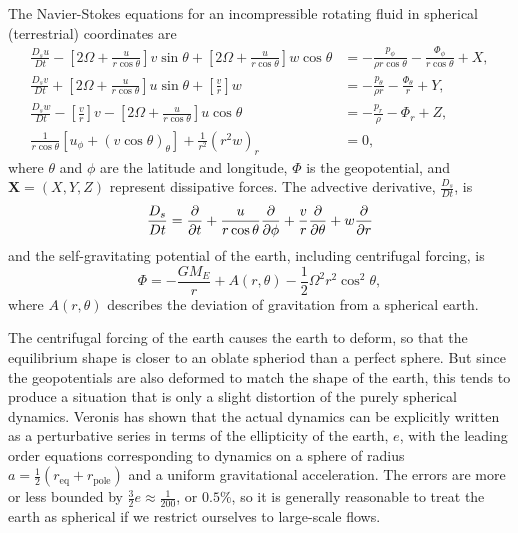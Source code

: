 \documentclass[11pt]{article}
\begin{document}
The Navier-Stokes equations for an incompressible rotating fluid in spherical (terrestrial) coordinates are
\begin{subequations}
\begin{align}
\frac{D_s u}{Dt} - \left[2\Omega + \frac{u}{r \cos \theta} \right] v \sin \theta + \left[2\Omega + \frac{u}{r \cos \theta} \right] w \cos \theta &= - \frac{p_\phi}{\rho r \cos \theta} - \frac{\Phi_\phi}{r \cos \theta} + X, \\
\frac{D_s v}{Dt} + \left[2\Omega + \frac{u}{r \cos \theta}\right] u \sin \theta + \left[\frac{v}{r}\right] w &= - \frac{p_\theta}{\rho r} - \frac{\Phi_\theta}{r} + Y, \\
\frac{D_s w}{Dt} - \left[\frac{v}{r}\right]v  - \left[2\Omega + \frac{u}{r \cos \theta} \right] u \cos \theta &= - \frac{p_r}{\rho} - \Phi_r + Z, \\
\frac{1}{r \cos \theta} \left[u_\phi + \left(v \cos \theta \right)_\theta \right] + \frac{1}{r^2} \left(r^2 w \right)_r &= 0,
\end{align}
\end{subequations}
where $\theta$ and $\phi$ are the latitude and longitude, $\Phi$ is the geopotential, and $\mathbf{X} = \left(X,Y,Z\right)$ represent dissipative forces. The advective derivative, $\frac{D_s}{Dt}$, is
\begin{equation*}
\frac{D_s}{Dt} = \frac{\partial }{\partial t} + \frac{u}{r \cos \theta} \frac{\partial }{\partial \phi} + \frac{v}{r} \frac{\partial }{\partial \theta} + w \frac{\partial }{\partial r}
\end{equation*}
and the self-gravitating potential of the earth, including centrifugal forcing, is
\begin{equation}
\Phi = - \frac{G M_E}{r} + A(r, \theta) - \frac{1}{2} \Omega^2 r^2 \cos^2 \theta,
\end{equation}
where $A(r, \theta)$ describes the deviation of gravitation from a spherical earth.

The centrifugal forcing of the earth causes the earth to deform, so that the equilibrium shape is closer to an oblate spheriod than a perfect sphere. But since the geopotentials are also  deformed to match the shape of the earth, this tends to produce a situation that is only a slight distortion of the purely spherical dynamics. Veronis \cite{Veronis1973} has shown that the actual dynamics can be explicitly written as a perturbative series in terms of the ellipticity of the earth, $e$, with the leading order equations corresponding to dynamics on  a sphere of radius $a = \frac{1}{2} \left(r_\textrm{eq} + r_\textrm{pole} \right)$ and a uniform gravitational acceleration. The errors are more or less bounded by $\frac{3}{2} e \approx \frac{1}{200}$, or $0.5\%$, so it is generally reasonable to treat the earth as spherical if we restrict ourselves to large-scale flows.
\end{document}

